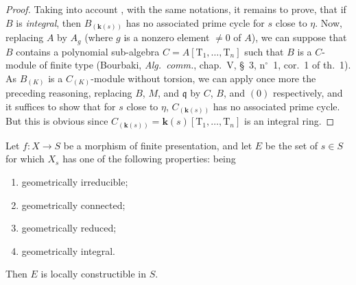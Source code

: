 \begin{proof}
Taking into account , with the same notations, it remains to prove, that if $B$ is \emph{integral}, then $B_{(\boldsymbol{k}(s))}$ has no associated prime cycle for $s$ close to $\eta$.
Now, replacing $A$ by $A_g$ (where $g$ is a nonzero element $\neq 0$ of $A$), we can suppose that $B$ contains a polynomial sub-algebra $C=A[\mathrm{T}_1,\ldots,\mathrm{T}_n]$ such that $B$ is a $C$-module of finite type (Bourbaki, \emph{Alg.\ comm.}, chap.\ V, \S~3, n$^\circ$~1, cor.\ 1 of th.\ 1).
As $B_{(K)}$ is a $C_{(K)}$-module without torsion, we can apply once more the preceding reasoning, replacing $B$, $M$, and $\mathfrak{q}$ by $C$, $B$, and $(0)$ respectively, and it suffices to show that for $s$ close to $\eta$, $C_{(\boldsymbol{k}(s))}$ has no associated prime cycle.
But this is obvious since $C_{(\boldsymbol{k}(s))}=\boldsymbol{k}(s)[\mathrm{T}_1,\ldots,\mathrm{T}_n]$ is an integral ring.
\end{proof}

\begin{theorem}[9.7.7]
\label{IV.9.7.7}
Let $f:X\to S$ be a morphism of finite presentation, and let $E$ be the set of $s\in S$ for which $X_s$ has one of the following properties: being
\begin{enumerate}[label=(\roman*)]
  \item geometrically irreducible;
  \item geometrically connected;
  \item geometrically reduced;
  \item geometrically integral.
\end{enumerate}
Then $E$ is locally constructible in $S$.
\end{theorem}

